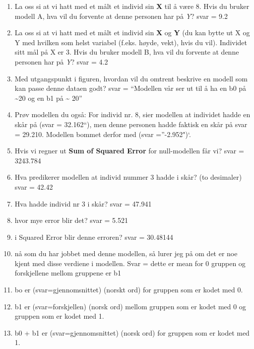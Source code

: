 \documentclass[
]{book}
\begin{document}
\begin{enumerate}
\def\labelenumi{\alph{enumi}.}
\item
  La oss si at vi hatt med et målt et individ sin \textbf{X} til å være 8. Hvis du bruker modell A, hva vil du forvente at denne personen har på \emph{Y}? svar = 9.2
\item
  La oss si at vi hatt med et målt et individ sin \textbf{X} og \textbf{Y} (du kan bytte ut X og Y med hvilken som helst variabel (f.eks. høyde, vekt), hvis du vil). Individet sitt mål på X er 3. Hvis du bruker modell B, hva vil du forvente at denne personen har på \emph{Y}? svar = 4.2
\item
  Med utgangspunkt i figuren, hvordan vil du omtrent beskrive en modell som kan passe denne dataen godt? svar = ``Modellen vår ser ut til å ha en b0 på \textasciitilde20 og en b1 på \textasciitilde{} 20''
\item
  Prøv modellen du også: For individ nr. 8, sier modellen at individet hadde en skår på (svar = 32.162``), men denne personen hadde faktisk en skår på svar = 29.210. Modellen bommet derfor med (svar =''-2.952")`.
\item
  Hvis vi regner ut \textbf{Sum of Squared Error} for null-modellen får vi? svar = 3243.784
\item
  Hva predikerer modellen at individ nummer 3 hadde i skår? (to desimaler) svar = 42.42
\item
  Hva hadde individ nr 3 i skår? svar = 47.941
\item
  hvor mye error blir det? svar = 5.521
\item
  i Squared Error blir denne erroren? svar = 30.48144
\item
  nå som du har jobbet med denne modellen, så lurer jeg på om det er noe kjent med disse verdiene i modellen. Svar = dette er mean for 0 gruppen og forskjellene mellom gruppene er b1
\item
  bo er (svar=gjennomsnittet) (norskt ord) for gruppen som er kodet med 0.
\item
  b1 er (svar=forskjellen) (norsk ord) mellom gruppen som er kodet med 0 og gruppen som er kodet med 1.
\item
  b0 + b1 er (svar=gjennomsnittet) (norsk ord) for gruppen som er kodet med 1.
\end{enumerate}

  
\end{document}
